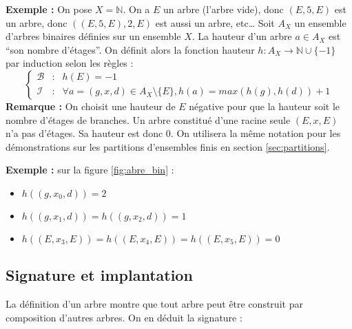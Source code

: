 \documentclass[../../../main.tex]{subfiles}
\begin{document}
\textbf{Exemple :} On pose $X = \mathbb{N}$. On a $E$ un arbre (l'arbre vide), donc $(E, 5, E)$ est un arbre, donc $((E, 5, E), 2, E)$ est aussi un arbre, etc\dots
{} {
Soit $A_X$ un ensemble d'arbres binaires définies sur un ensemble $X$. La hauteur d'un arbre $a\in A_X$ est ``son nombre d'étages''. On définit alors la fonction hauteur $h : A_{X} \rightarrow{\mathbb{N}\cup\{-1\}}$ par induction selon les règles :
$$\left\{\begin{array}{cll}
	\mathcal{B} & : & h(E) = -1 \\
	\mathcal{I} & : & \forall{a = (g, x, d)\in{A_{X}}\setminus{\{E\}}}, h(a) = max(h(g), h(d)) + 1
\end{array}\right.$$
}
\textbf{Remarque :} On choisit une hauteur de $E$ négative pour que la hauteur soit le nombre d'étages de branches. Un arbre constitué d'une racine seule $(E, x, E)$ n'a pas d'étages. Sa hauteur est donc $0$. On utilisera la même notation pour les démonstrations sur les partitions d'ensembles finis en section \ref{sec:partitions}.

\textbf{Exemple :} sur la figure \ref{fig:abre_bin} :
\begin{itemize}
	\item $h((g, x_0, d)) = 2$
	\item $h((g, x_1, d)) = h((g, x_2, d)) = 1$
	\item $h((E, x_3, E)) = h((E, x_4, E)) = h((E, x_5, E)) = 0$
\end{itemize}
\subsection{Signature et implantation}
La définition d'un arbre montre que tout arbre peut être construit par composition d'autres arbres. On en déduit la signature :
\end{document}
